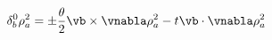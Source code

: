 \begin{equation}
     \delta^0_{b}\rho_{a}^2=
     \pm\frac{\theta}{2}\vb\times\vnabla\rho_{a}^2
     -t\vb\cdot\vnabla\rho_{a}^2
\end{equation}

